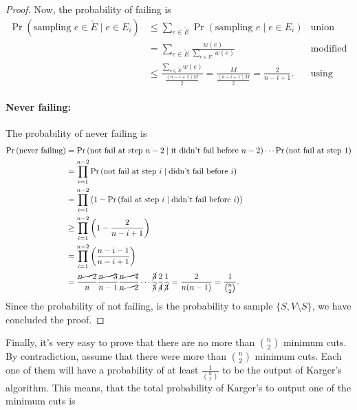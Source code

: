 \documentclass[11pt]{article}
\begin{document}
\begin{enumerate}
\begin{proof}
        Now, the probability of failing is 
        \begin{align*}
            \Pr\left(\text{sampling }e \in \tilde E \mid e \in E_i\right) &\leq \sum_{e \in \tilde E}\Pr\left(\text{sampling }e\mid e \in E_i\right) & \text{union bound}\\
            &= \sum_{e \in \tilde E}\frac{w(e)}{\sum_{e\in E'}w(e)} &\text{modified algoritm}\\
            & \leq \frac{\sum_{e \in \tilde E}w(e)}{\frac{(n-i+1)M}{2}} = \frac{M}{\frac{(n-i+1)M}{2}} = \frac{2}{n-i+1}. &\text{using the result above}
        \end{align*}
        \paragraph*{Never failing:} The probability of never failing is 
        \begin{align*}
            \Pr\left(\text{never failing}\right) &= \Pr\left(\text{not fail at step $n-2$}\mid \text{it didn't fail before $n-2$}\right) \cdots \Pr\left(\text{not fail at step $1$}\right)\\
            &=\prod_{i=1}^{n-2}\Pr\left(\text{not fail at step $i$}\mid \text{didn't fail before $i$}\right)\\
            & = \prod_{i=1}^{n-2}\left(1-\Pr\left(\text{fail at step $i$}\mid \text{didn't fail before $i$}\right)\right)\\
            & \geq \prod_{i=1}^{n-2}\left(1-\frac{2}{n-i+1}\right) \\
            & = \prod_{i=1}^{n-2}\left(\frac{n-i-1}{n-i+1}\right) \\
            & = \frac{\cancel{n-2}}{n}\frac{\cancel{n-3}}{n-1}\frac{\cancel{n-4}}{\cancel{n-2}}\cdots \frac{\cancel{3}}{\cancel{5}}\frac{2}{\cancel{4}}\frac{1}{\cancel{3}} = \frac{2}{n(n-1)} = \frac{1}{\binom{n}{2}}.
        \end{align*}
        Since the probability of not failing, is the probability to sample $\{S,V\setminus S\}$, we have concluded the proof.
    \end{proof}
    Finally, it's very easy to prove that there are no more than $\binom{n}{2}$ minimum cuts. By contradiction, assume that there were more than $\binom{n}{2}$ minimum cuts. Each one of them will have a probability of at least $\frac{1}{\binom{n}{2}}$ to be the output of Karger's algorithm. This means, that the total probability of Karger's to output one of the minimum cuts is 
    \begin{align*}

\end{align*}
\end{enumerate}
\end{document}
